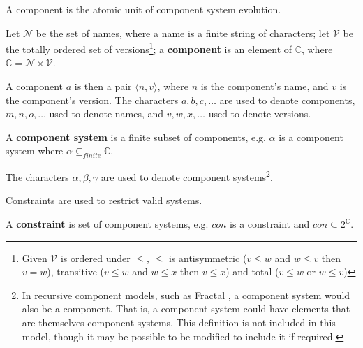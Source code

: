 A component is the atomic unit of component system evolution.
\begin{defs}
\label{formal.componentdef}
Let $\mathcal{N}$ be the set of names, where a name is a finite string of characters; 
let $\mathcal{V}$ be the totally ordered set of versions\footnote{Given $\mathcal{V}$ is ordered under 
$\leq$, $\leq$ is antisymmetric ($v \leq w$ and $w \leq v$ then $v = w$), transitive ($v \leq w$ and $w \leq x$ then $v \leq x$) and total ($v \leq w$ or $w \leq v$)}; 
a \textbf{component}
is an element of $\mathbb{C}$, where $\mathbb{C} = \mathcal{N} \times \mathcal{V}$.
\end{defs}
A component $a$ is then a pair $\langle n,v \rangle$, where $n$ is the component's name, and $v$ is the component's version.
The characters  $a,b,c,\ldots$ are used to denote components, $m,n,o,\ldots$ used to denote names, and $v,w,x,\ldots$ used to denote versions.

\begin{defs}
\label{formal.componentsystemdef}
A \textbf{component system} is a finite subset of components, e.g. $\alpha$ is a component system where $\alpha \subseteq_{finite} \mathbb{C}$. 
\end{defs}
The characters $\alpha,\beta,\gamma$ are used to denote component systems\footnote{In recursive component models, such as Fractal \citep{Quma2006}, 
a component system would also be a component.
That is, a component system could have elements that are themselves component systems.
This definition is not included in this model, though it may be possible to be modified to include it if required.}.

Constraints are used to restrict valid systems.
\begin{defs}
\label{formal.constraintdefs}
A \textbf{constraint} is set of component systems, e.g. $con$ is a constraint and $con \subseteq 2^{\mathbb{C}}$.
\end{defs}

